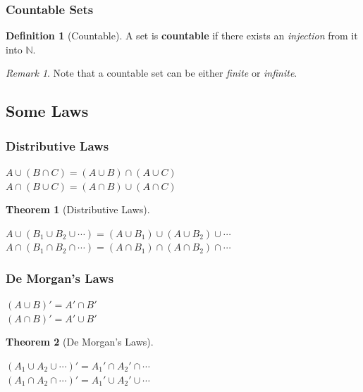 \documentclass[10pt,UTF8]{article}
\newenvironment{definition box}
{\begin{tcolorbox}[colback=blue!5!white,colframe=blue!75!black,parbox=false,before upper=\par,before lower=\par]}
{\end{tcolorbox}}
\newenvironment{theorem box}
{\begin{tcolorbox}[colback=yellow!5!white,colframe=yellow!75!black,parbox=false,before upper=\par,before lower=\par]}
{\end{tcolorbox}}
\theoremstyle{definition}
\newtheorem{definition inner}{Definition}[section]
\newenvironment{definition}[1][]
{\begin{definition box}\begin{definition inner}[#1]\hfill\par}
{\end{definition inner}\end{definition box}}
\theoremstyle{plain}
\newtheorem{theorem inner}{Theorem}[section]
\newenvironment{theorem}[1][]
{\begin{theorem box}\begin{theorem inner}[#1]\hfill\par}
{\end{theorem inner}\end{theorem box}}
\theoremstyle{definition}
\newtheorem*{proof inner}{\textit{Proof}}
\theoremstyle{remark}
\newtheorem*{remark}{\textit{Remark}}
\begin{document}
\subsubsection{Countable Sets}
\begin{definition}[Countable]
    A set is \textbf{countable} if there exists an \emph{injection} from it into $\mathbb{N}$.
\end{definition}

\begin{remark}
    Note that a countable set can be either \emph{finite} or \emph{infinite}.
\end{remark}

\subsection{Some Laws}

\subsubsection{Distributive Laws}
\begin{center}
    $A \cup (B \cap C) = (A \cup B) \cap (A \cup C)$ \\
    $A \cap (B \cup C) = (A \cap B) \cup (A \cap C)$
\end{center}

\begin{theorem}[Distributive Laws]
    \begin{center}
        $A \cup \left(B_1 \cup B_2 \cup \cdots \right) = 
        \left(A \cup B_1\right) \cup \left(A \cup B_2\right) \cup \cdots$ \\
        $A \cap \left(B_1 \cap B_2 \cap \cdots \right) = 
        \left(A \cap B_1\right) \cap \left(A \cap B_2\right) \cap \cdots$
    \end{center}
\end{theorem}

\subsubsection{De Morgan's Laws}
\begin{center}
    $(A \cup B)' = A' \cap B'$ \\
    $(A \cap B)' = A' \cup B'$
\end{center}

\begin{theorem}[De Morgan's Laws]
    \begin{center}
        $\left(A_1 \cup A_2 \cup \cdots \right)' = A_1' \cap A_2' \cap \cdots$ \\
        $\left(A_1 \cap A_2 \cap \cdots \right)' = A_1' \cup A_2' \cup \cdots$
    \end{center}
\end{theorem}
\end{document}
